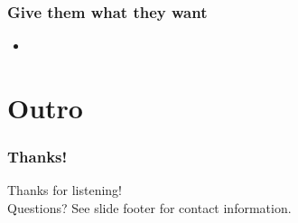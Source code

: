 \documentclass[t]{beamer}
\begin{document}
\begin{frame}
	\frametitle{Give them what they want}
	\begin{itemize}
		\item 
	\end{itemize}
\end{frame}









%






\section{Outro}

\begin{frame}
	\frametitle{Thanks!}
		\begin{center}
			\vfill
			Thanks for listening!\\
			\vfill
			Questions?
			\vfill
			See slide footer for contact information.
			\vfill
		\end{center}
\end{frame}
\end{document}
